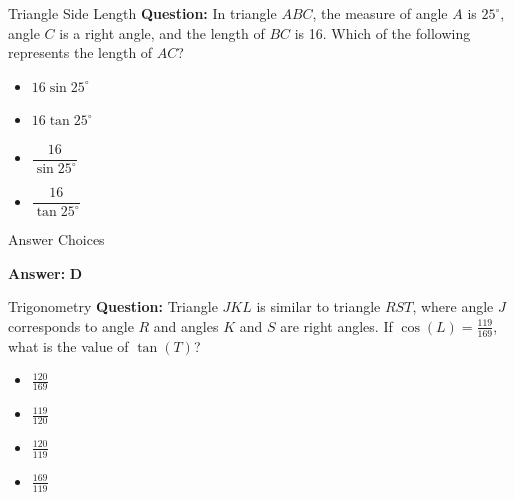 \documentclass{beamer}
\begin{document}
\begin{frame}
\end{frame}





\begin{frame}{Triangle Side Length}
\textbf{Question:}  
In triangle \(ABC\), the measure of angle \(A\) is \(25^\circ\), angle \(C\) is a right angle, and the length of \(BC\) is 16. Which of the following represents the length of \(AC\)?
\begin{itemize}
    \item[A] \(16 \sin 25^\circ\)
    \item[B] \(16 \tan 25^\circ\)
    \item[C] \(\dfrac{16}{\sin 25^\circ}\)
    \item[D] \(\dfrac{16}{\tan 25^\circ}\)
\end{itemize}
\end{frame}

\begin{frame}{Answer Choices}


\textbf{Answer:} \textbf{D}
\end{frame}


\begin{frame}{Trigonometry}
\textbf{Question:}  
Triangle \(JKL\) is similar to triangle \(RST\), where angle \(J\) corresponds to angle \(R\) and angles \(K\) and \(S\) are right angles. If \(\cos(L) = \frac{119}{169}\), what is the value of \(\tan(T)\)?
\begin{itemize}
    \item[A] \(\frac{120}{169}\)
    \item[B] \(\frac{119}{120}\)
    \item[C] \(\frac{120}{119}\)
    \item[D] \(\frac{169}{119}\)
\end{itemize}
\end{frame}
\end{document}
